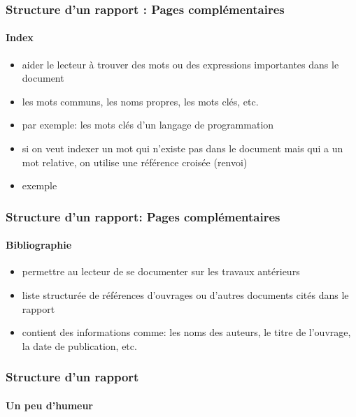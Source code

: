 \documentclass[xcolor=table]{beamer}
\begin{document}
\begin{frame}
\frametitle{Structure d'un rapport : Pages complémentaires}
\framesubtitle{Index}

\begin{minipage}{0.60\textwidth}
	\begin{itemize}
		\item aider le lecteur à trouver des mots ou des expressions importantes dans le document
		\item les mots communs, les noms propres, les mots clés, etc. 
		\item par exemple: les mots clés d'un langage de programmation 
		\item si on veut indexer un mot qui n'existe pas dans le document mais qui a un mot relative, on utilise une référence croisée (renvoi) 
		\item exemple 
	\end{itemize}
\end{minipage}
\begin{minipage}{0.38\textwidth}
\end{minipage}

\end{frame}


\begin{frame}
\frametitle{Structure d'un rapport: Pages complémentaires}
\framesubtitle{Bibliographie}

\begin{minipage}{0.60\textwidth}
	\begin{itemize}
		\item permettre au lecteur de se documenter sur les travaux antérieurs
		\item liste structurée de références d'ouvrages ou d'autres documents cités dans le rapport
		\item contient des informations comme: les noms des auteurs, le titre de l'ouvrage, la date de publication, etc.
	\end{itemize}
\end{minipage}
\begin{minipage}{0.38\textwidth}
\end{minipage}

\end{frame}

\begin{frame}
\frametitle{Structure d'un rapport}
\framesubtitle{Un peu d'humeur}

\begin{center}
\end{center}

\end{frame}
\end{document}
